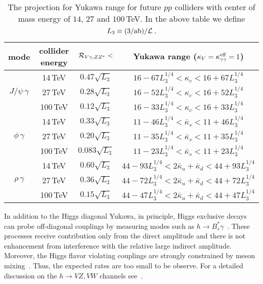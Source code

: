 \documentclass[../report.tex]{subfiles}
\begin{document}
\begin{table}[t]
\begin{center}
\begin{tabular}{|c|c|c|c|}
\hline
mode & collider energy & $\mathcal{R}_{V\gamma,ZZ^*}<$ &Yukawa range ($\kappa_V=\kappa^{\rm eff}_{\gamma\gamma}=1$)   \\
\hline\hline 
\multirow{ 3}{*}{$J/\psi\,\gamma$} &
14\,TeV & 
$0.47\sqrt{L_3}$ &
$16 - 67 L_3^{1/4}  < \kappa_c < 16 + 67 L_3^{1/4} $\\
&
27\,TeV & 
$0.28\sqrt{L_3}$ &
$16 - 52 L_3^{1/4}  < \kappa_c < 16 + 52 L_3^{1/4} $\\
&
100\,TeV & 
$0.12\sqrt{L_3}$ &
$16 - 33 L_3^{1/4}  < \kappa_c < 16 + 33 L_3^{1/4} $\\
\hline
\multirow{ 3}{*}{$\phi\,\gamma$} &
14\,TeV & 
$0.33\sqrt{L_3}$ &
$11 - 46 L_3^{1/4} < \bar{\kappa}_s < 11 + 46 L_3^{1/4} $\\
&
27\,TeV & 
$0.20\sqrt{L_3}$ &
$11 - 35 L_3^{1/4} < \bar{\kappa}_s < 11 + 35 L_3^{1/4} $\\
&
100\,TeV & 
$0.083\sqrt{L_3}$ &
$11 - 23 L_3^{1/4} < \bar{\kappa}_s < 11 + 23 L_3^{1/4} $\\
\hline
\multirow{ 3}{*}{$\rho\,\gamma$} &
14\,TeV & 
$0.60\sqrt{L_3}$ &
$44 - 93 L_3^{1/4} < 2\bar{\kappa}_u + \bar{\kappa}_d < 44 + 93 L_3^{1/4} $\\
&
27\,TeV & 
$0.36\sqrt{L_3}$ &
$44 - 72 L_3^{1/4} < 2\bar{\kappa}_u + \bar{\kappa}_d < 44 + 72 L_3^{1/4} $\\
&
100\,TeV & 
$0.15\sqrt{L_3}$ &
$44 - 47 L_3^{1/4} < 2\bar{\kappa}_u + \bar{\kappa}_d < 44 + 47 L_3^{1/4} $\\
\hline\hline
\end{tabular}
\end{center}
\caption{The projection for Yukawa range for future $pp$ colliders with center of mass energy of $14$, $27$ and $100\,$TeV. In the above table we define $L_3\equiv (3/{\rm ab})/\mathcal{L}\,$. }
\label{tab:exclusiveproj}
\end{table}%

In addition to the Higgs diagonal Yukawa, in principle, Higgs exclusive decays can probe off-diagonal couplings by measuring modes such as $h\to B^*_s \gamma$~\cite{Kagan:2014ila}. 
These processes receive contribution only from the direct amplitude and there is not enhancement from interference with the relative large indirect amplitude. 
Moreover, the Higgs flavor violating couplings are strongly constrained by meson mixing~\cite{Blankenburg:2012ex,Harnik:2012pb}. Thus, the expected rates are too small to be observe. 
For a detailed discussion on the $h \to VZ,VW$ channels see~\cite{Alte:2016yuw}.
\end{document}
